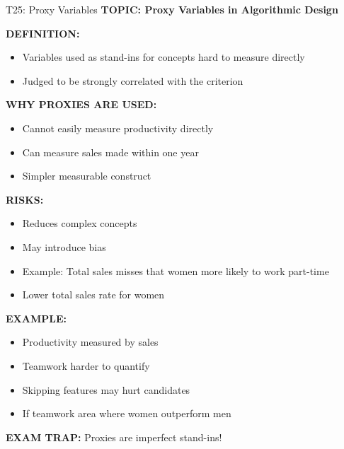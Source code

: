 \documentclass[8pt]{beamer}
\begin{document}
	\begin{frame}{T25: Proxy Variables}
		\fontsize{6.5}{7.5}\selectfont
		\textbf{TOPIC: Proxy Variables in Algorithmic Design}
		
		\vspace{0.1cm}
		\textbf{DEFINITION:}
		\begin{itemize}
			\item Variables used as stand-ins for concepts hard to measure directly
			\item Judged to be strongly correlated with the criterion
		\end{itemize}
		
		\vspace{0.1cm}
		\textbf{WHY PROXIES ARE USED:}
		\begin{itemize}
			\item Cannot easily measure productivity directly
			\item Can measure sales made within one year
			\item Simpler measurable construct
		\end{itemize}
		
		\vspace{0.1cm}
		\textbf{RISKS:}
		\begin{itemize}
			\item Reduces complex concepts
			\item May introduce bias
			\item Example: Total sales misses that women more likely to work part-time
			\item Lower total sales rate for women
		\end{itemize}
		
		\vspace{0.1cm}
		\textbf{EXAMPLE:}
		\begin{itemize}
			\item Productivity measured by sales
			\item Teamwork harder to quantify
			\item Skipping features may hurt candidates
			\item If teamwork area where women outperform men
		\end{itemize}
		
		\textcolor{myred}{\textbf{EXAM TRAP:}} Proxies are \textcolor{myblue}{imperfect stand-ins}!
	\end{frame}
	
\end{document}
